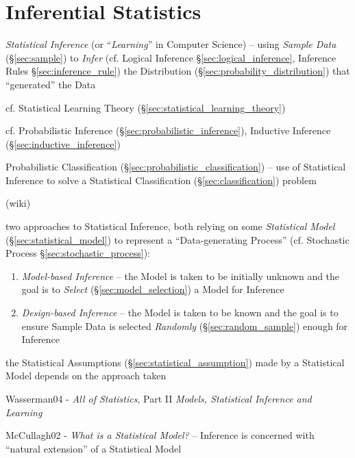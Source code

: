 \section{Inferential Statistics}\label{sec:inferential_statistics}

\emph{Statistical Inference} (or ``\emph{Learning}'' in Computer Science) --
using \emph{Sample Data} (\S\ref{sec:sample}) to \emph{Infer} (cf. Logical
Inference \S\ref{sec:logical_inference}, Inference Rules
\S\ref{sec:inference_rule}) the Distribution
(\S\ref{sec:probability_distribution}) that ``generated'' the Data

\fist cf. Statistical Learning Theory (\S\ref{sec:statistical_learning_theory})

\fist cf. Probabilistic Inference
(\S\ref{sec:probabilistic_inference}), Inductive Inference
(\S\ref{sec:inductive_inference})

\fist Probabilistic Classification (\S\ref{sec:probabilistic_classification}) --
use of Statistical Inference to solve a Statistical Classification
(\S\ref{sec:classification}) problem

(wiki)

two approaches to Statistical Inference, both relying on some \emph{Statistical
  Model} (\S\ref{sec:statistical_model}) to represent a ``Data-generating
Process'' (cf. Stochastic Process \S\ref{sec:stochastic_process}):
\begin{enumerate}
  \item \emph{Model-based Inference} -- the Model is taken to be initially
    unknown and the goal is to \emph{Select} (\S\ref{sec:model_selection}) a
    Model for Inference
  \item \emph{Design-based Inference} -- the Model is taken to be known and the
    goal is to ensure Sample Data is selected \emph{Randomly}
    (\S\ref{sec:random_sample}) enough for Inference
\end{enumerate}
the Statistical Assumptions (\S\ref{sec:statistical_assumption}) made by a
Statistical Model depends on the approach taken

Wasserman04 - \emph{All of Statistics}, Part II \emph{Models, Statistical
  Inference and Learning}

McCullagh02 - \emph{What is a Statistical Model?} -- Inference is concerned with
``natural extension'' of a Statistical Model



